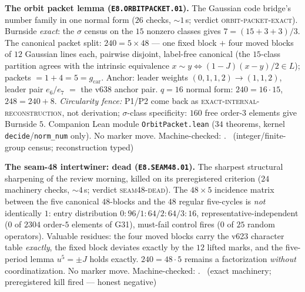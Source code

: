\par\smallskip\noindent\textbf{The orbit packet lemma
(\texttt{E8.ORBITPACKET.01}).}
The Gaussian code bridge's number family in one normal form ($26$
checks, ${\sim}1$\,s; verdict \textsc{orbit-packet-exact}).
Burnside \emph{exact}: the $\sigma$ census on the $15$ nonzero
classes gives $7=(15+3+3)/3$.  The canonical packet split:
$240=5\times48$ --- one fixed block $+$ four moved blocks of $12$
Gaussian lines each, pairwise disjoint, label-free canonical (the
$15$-class partition agrees with the intrinsic equivalence
$x\sim y\iff(1-J)(x-y)/2\in L$); packets $=1+4=5=g_{\mathrm{car}}$.
Anchor: leader weights $(0,1,1,2)\to(1,1,2)$, leader pair $e_6/e_7$
$=$ the v638 anchor pair.  $q=16$ normal form: $240=16\cdot15$,
$248=240+8$.  \emph{Circularity fence:} P1/P2 come back as
\textsc{exact-internal-reconstruction}, not derivation;
$\sigma$-class specificity: $160$ free order-$3$ elements give
Burnside $5$.  Companion Lean module \texttt{OrbitPacket.lean}
($34$ theorems, kernel \texttt{decide}/\texttt{norm\_num} only).
No marker move.
Machine-checked: .
\mE\ (integer/finite-group census; reconstruction typed)
\par\smallskip

\par\smallskip\noindent\textbf{The seam-48 intertwiner: dead
(\texttt{E8.SEAM48.01}).}
The sharpest structural sharpening of the review morning, killed on
its preregistered criterion ($24$ machinery checks, ${\sim}4$\,s;
verdict \textsc{seam48-dead}).  The $48\times5$ incidence matrix
between the five canonical $48$-blocks and the $48$ regular
five-cycles is \emph{not} identically $1$: entry distribution
$0{:}96/1{:}64/2{:}64/3{:}16$, representative-independent ($0$ of
$2304$ order-$5$ elements of G31), must-fail control fires ($0$ of
$25$ random operators).  Valuable residues: the four moved blocks
carry the v623 character table \emph{exactly}, the fixed block
deviates exactly by the $12$ lifted marks, and the five-period
lemma $u^5=\pm J$ holds exactly.  $240=48\cdot5$ remains a
factorization \emph{without} coordinatization.  No marker move.
Machine-checked: .
\mE\ (exact machinery; preregistered kill fired --- honest
negative)
\par\smallskip

